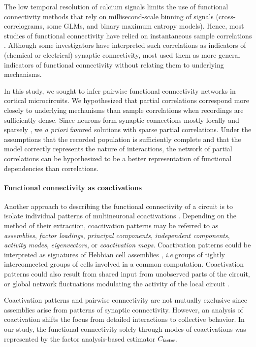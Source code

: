 \documentclass[10pt]{article}
\newcommand{\ie}{\emph{i.e.}\;}
\begin{document}
The low temporal resolution of calcium signals limits the use of functional connectivity methods that rely on millisecond-scale binning of signals (cross-correlograms, some GLMs, and binary maximum entropy models).  Hence, most studies of functional connectivity have relied on instantaneous sample correlations \cite{Greenberg:2008, Golshani:2009, Hofer:2011, Malmersjo:2013} .  Although some investigators have interpreted such correlations as indicators of (chemical or electrical) synaptic connectivity, most used them as more general indicators of functional connectivity without relating them to underlying mechanisms. 

In this study, we sought to infer pairwise functional connectivity networks  in cortical microcircuits. We hypothesized that partial correlations correspond more closely to underlying mechanisms than sample correlations when recordings are sufficiently dense.  Since neurons form synaptic connections mostly locally and sparsely \cite{Perin:2011}, we \emph{a priori} favored solutions with sparse partial correlations.  Under the assumptions that the recorded population is sufficiently complete and that the model correctly represents the nature of interactions, the network of partial correlations can be hypothesized to be a better representation of functional dependencies than correlations. 

\paragraph{Functional connectivity as coactivations}
Another approach to describing the functional connectivity of a circuit is to isolate individual patterns of multineuronal coactivations \cite{Gerstein:1989, Chapin:1999, Peyrache:2010, Ch:2010, Lopes:2011, Lopes:2013}. Depending on the method of their extraction, coactivation patterns may be referred to as \emph{assemblies}, \emph{factor loadings}, \emph{principal components}, \emph{independent components}, \emph{activity modes}, \emph{eigenvectors}, or \emph{coactivation maps}. Coactivation patterns could be interpreted as signatures of Hebbian cell assemblies \cite{Gerstein:1989, Ch:2010}, \ie groups of tightly interconnected groups of cells involved in a common computation.  Coactivation patterns could also result from shared input from unobserved parts of the circuit, or global network fluctuations modulating the activity of the local circuit \cite{Okun:2012}.

Coactivation patterns and pairwise connectivity are not mutually exclusive since assemblies arise from patterns of synaptic connectivity.  However, an analysis of coactivation shifts the focus from detailed interactions to  collective behavior.  
In our study, the functional connectivity solely through modes of coactivations was represented by the factor analysis-based estimator $C_{\sf factor}$.
\end{document}
